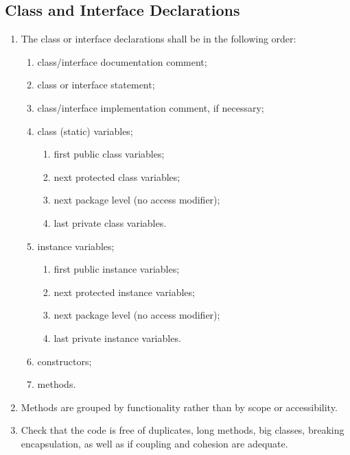 \documentclass{article}
\begin{document}
\subsection*{Class and Interface Declarations}\begin{enumerate}[resume]
\item The class or interface declarations shall be in the following order:
	\begin{enumerate}
		\item class/interface documentation comment;
		\item class or interface statement;
		\item class/interface implementation comment, if necessary;
		\item class (static) variables;
		\begin{enumerate}
			\item first public class variables;
			\item next protected class variables;
			\item next package level (no access modifier);
			\item last private class variables.
		\end{enumerate}
		\item instance variables;
		\begin{enumerate}
			\item first public instance variables;
			\item next protected instance variables;
			\item next package level (no access modifier);
			\item last private instance variables.
		\end{enumerate}
		\item constructors;
		\item methods.
	\end{enumerate}
	\item Methods are grouped by functionality rather than by scope or accessibility.
	\item Check that the code is free of duplicates, long methods, big classes, breaking encapsulation, as well as if coupling and cohesion are adequate.
\end{enumerate}
\end{document}
